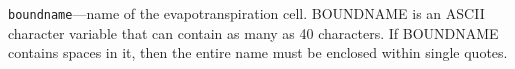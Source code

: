 \begin{description}
\item \texttt{boundname}---name of the evapotranspiration cell.  BOUNDNAME is an ASCII character variable that can contain as many as 40 characters.  If BOUNDNAME contains spaces in it, then the entire name must be enclosed within single quotes.

\end{description}

